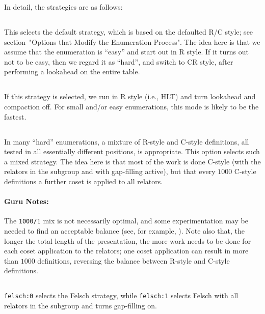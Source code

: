 In detail, the strategies are as follows:

\subsection{}
\label{cmd:default}
This selects the default strategy, which is based on the defaulted R/C
style; see section~"Options that Modify the Enumeration Process".  The idea
here is that we assume that the enumeration is ``easy'' and start out in R
style.  If it turns out not to be easy, then we regard it as ``hard'', and
switch to CR style, after performing a lookahead on the entire table.

\subsection{}
\label{cmd:easy}
If this strategy is selected, we run in R style (i.e., HLT) and turn
lookahead and compaction off.  For small and/or easy enumerations, this mode
is likely to be the fastest.

\subsection{}
\label{cmd:hard}
In many
``hard'' enumerations, a mixture of R-style and C-style definitions, all
tested in all essentially different positions, is appropriate.  This option
selects such a mixed strategy.  The idea here is that most of the work is
done C-style (with the relators in the subgroup and with gap-filling
active), but that every $1000$ C-style definitions a further coset is
applied to all relators.

\paragraph{Guru Notes:}
The {\tt 1000/1} mix is not necessarily optimal, and some
  experimentation may be needed to find an acceptable balance (see, for
  example, \cite{HR1}).
Note also that, the longer the total length of the presentation, the more
  work needs to be done for each coset application to the relators; one
  coset application can result in more than $1000$ definitions, reversing
  the balance between R-style and C-style definitions.

\subsection{}
\label{cmd:felsch}
{\tt felsch:0} selects the Felsch strategy, while {\tt felsch:1} selects Felsch with all
relators in the subgroup and turns gap-filling on.


